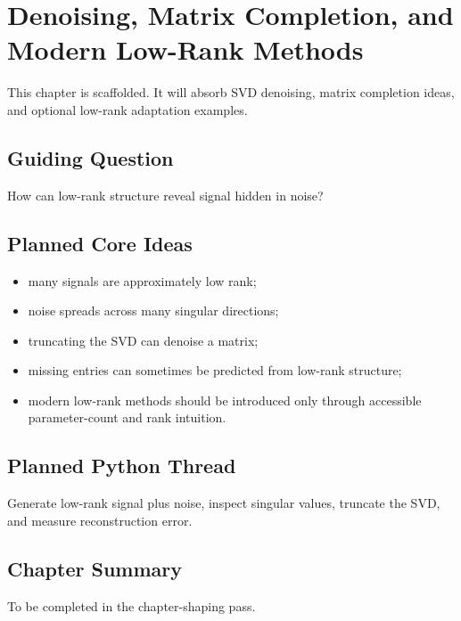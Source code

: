 \chapter{Denoising, Matrix Completion, and Modern Low-Rank Methods}
\label{ch:denoising-low-rank-methods}

\begin{draftbox}
This chapter is scaffolded. It will absorb SVD denoising, matrix completion
ideas, and optional low-rank adaptation examples.
\end{draftbox}

\section{Guiding Question}

How can low-rank structure reveal signal hidden in noise?

\section{Planned Core Ideas}

\begin{itemize}
  \item many signals are approximately low rank;
  \item noise spreads across many singular directions;
  \item truncating the SVD can denoise a matrix;
  \item missing entries can sometimes be predicted from low-rank structure;
  \item modern low-rank methods should be introduced only through accessible
    parameter-count and rank intuition.
\end{itemize}

\section{Planned Python Thread}

Generate low-rank signal plus noise, inspect singular values, truncate the SVD,
and measure reconstruction error.

\section*{Chapter Summary}

To be completed in the chapter-shaping pass.


